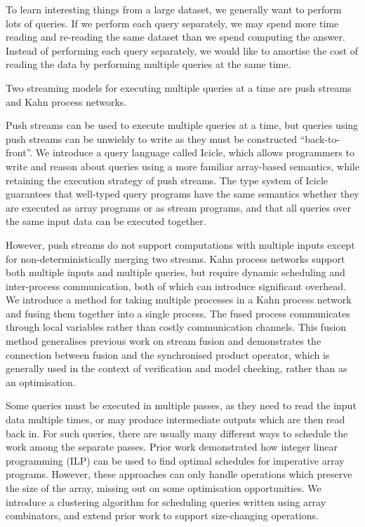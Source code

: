 To learn interesting things from a large dataset, we generally want to perform lots of queries.
If we perform each query separately, we may spend more time reading and re-reading the same dataset than we spend computing the answer.
Instead of performing each query separately, we would like to amortise the cost of reading the data by performing multiple queries at the same time.

Two streaming models for executing multiple queries at a time are push streams and Kahn process networks.

Push streams can be used to execute multiple queries at a time, but queries using push streams can be unwieldy to write as they must be constructed ``back-to-front''.
We introduce a query language called Icicle, which allows programmers to write and reason about queries using a more familiar array-based semantics, while retaining the execution strategy of push streams.
The type system of Icicle guarantees that well-typed query programs have the same semantics whether they are executed as array programs or as stream programs, and that all queries over the same input data can be executed together.

However, push streams do not support computations with multiple inputs except for non-deterministically merging two streams.
Kahn process networks support both multiple inputs and multiple queries, but require dynamic scheduling and inter-process communication, both of which can introduce significant overhead.
We introduce a method for taking multiple processes in a Kahn process network and fusing them together into a single process.
The fused process communicates through local variables rather than costly communication channels.
This fusion method generalises previous work on stream fusion and demonstrates the connection between fusion and the synchronised product operator, which is generally used in the context of verification and model checking, rather than as an optimisation.

Some queries must be executed in multiple passes, as they need to read the input data multiple times, or may produce intermediate outputs which are then read back in.
For such queries, there are usually many different ways to schedule the work among the separate passes.
Prior work demonstrated how integer linear programming (ILP) can be used to find optimal schedules for imperative array programs.
However, these approaches can only handle operations which preserve the size of the array, missing out on some optimisation opportunities.
We introduce a clustering algorithm for scheduling queries written using array combinators, and extend prior work to support size-changing operations.

